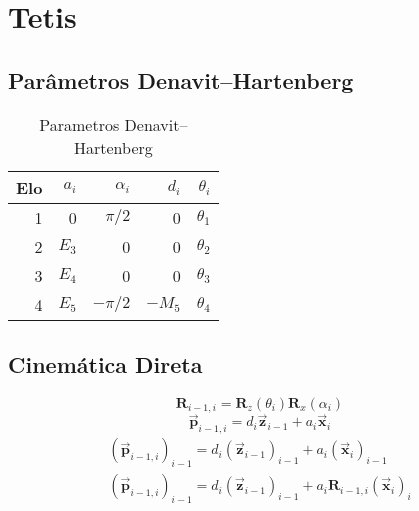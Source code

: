 \chapter{Tetis}

\section{Parâmetros Denavit–Hartenberg}
\begin{table}[!ht]
\centering
\caption{Parametros Denavit–Hartenberg}
\label{my-label}
\begin{tabular}{rrrrr} \hline
Elo & $a_i$ & $\alpha_i$ & $d_i$  & $\theta_i$ \\ \hline
1   & 0     & $\pi/2$    & 0      & $\theta_1$ \\
2   & $E_3$ & 0          & 0      & $\theta_2$ \\
3   & $E_4$ & 0          & 0      & $\theta_3$ \\
4   & $E_5$ & $-\pi/2$   & $-M_5$ & $\theta_4$ \\ \hline
\end{tabular}
\end{table}

\section{Cinemática Direta}

\begin{equation}
\bm{R}_{i-1,i} = \bm{R}_z(\theta_i)\bm{R}_x(\alpha_i)
\end{equation}
\begin{equation}
\bm{\vec{p}}_{i-1,i} = d_i \bm{\vec{z}}_{i-1} + a_i \bm{\vec{x}}_i
\end{equation}
\begin{gather}
(\bm{\vec{p}}_{i-1,i})_{i-1} = d_i (\bm{\vec{z}}_{i-1})_{i-1} + a_i (\bm{\vec{x}}_i)_{i-1} \\
(\bm{\vec{p}}_{i-1,i})_{i-1} = d_i (\bm{\vec{z}}_{i-1})_{i-1} + a_i \bm{R}_{i-1,i}(\bm{\vec{x}}_i)_{i} 
\end{gather}

